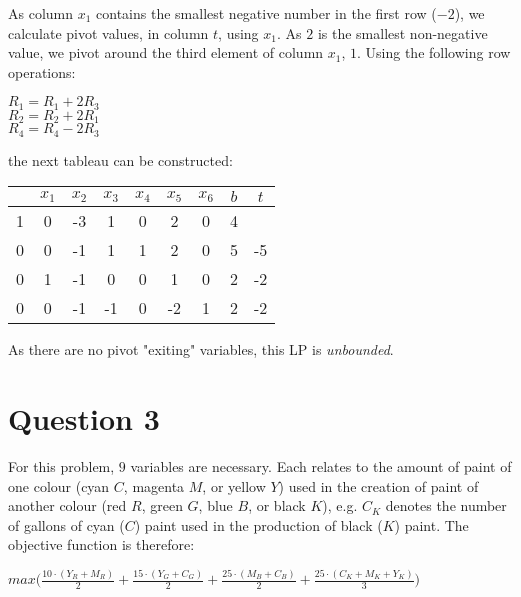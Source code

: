 \documentclass[11pt]{article} %
\begin{document}
As column $x_1$ contains the smallest negative number in the first row ($-2$), we calculate pivot values, in column $t$, using $x_1$. As $2$ is the smallest non-negative value, we pivot around the third element of column $x_1$, $1$. Using the following row operations:

\begin{center}

$R_1 = R_1 + 2R_3$ \\
$R_2 = R_2 + 2R_1$ \\
$R_4 = R_4 - 2R_3$ \\

\end{center}

the next tableau can be constructed:

\begin{center}

\begin{tabular}{ c | c c c c c c | c | c  }
    & $x_1$ & $x_2$ & $x_3$ & $x_4$ & $x_5$ & $x_6$ & $b$ & $t$\\ \hline
  1 & 0 & -3 & 1 & 0 & 2 & 0 & 4 &  \\  \hline
  0 & 0 & -1 & 1 & 1 & 2 & 0 & 5 & -5 \\
  0 & 1 & -1 & 0 & 0 & 1 & 0 & 2 & -2\\
  0 & 0 & -1 & -1 & 0 & -2 & 1 & 2 & -2\\
\end{tabular}

\end{center}

As there are no pivot "exiting" variables, this LP is \textit{unbounded}.

\clearpage

\section*{Question 3}

For this problem, $9$ variables are necessary. Each relates to the amount of paint of one colour (cyan $C$, magenta $M$, or yellow $Y$) used in the creation of paint of another colour (red $R$, green $G$, blue $B$, or black $K$), e.g. $C_K$ denotes the number of gallons of cyan ($C$) paint used in the production of black ($K$) paint. The objective function is therefore:

\begin{center}

$max \bigl( \frac{10 \cdot (Y_R + M_R)}{2} + \frac{15 \cdot (Y_G + C_G)}{2} + \frac{25 \cdot (M_B + C_B)}{2} + \frac{25 \cdot (C_K + M_K + Y_K)}{3}\bigr)$

\end{center}
\end{document}
